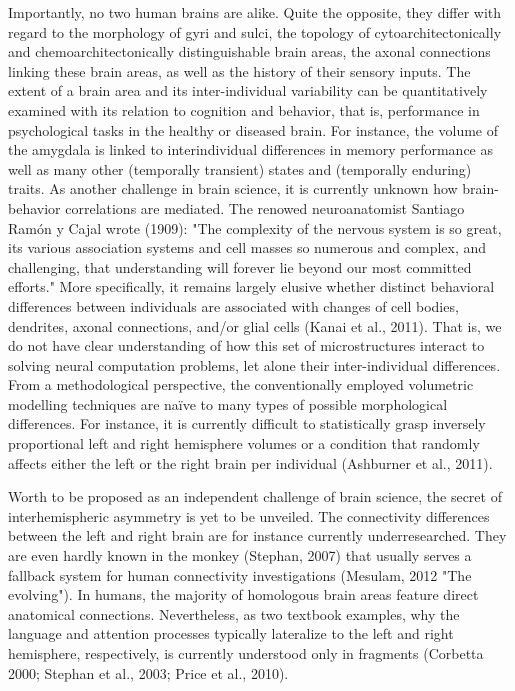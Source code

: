 \documentclass[authoryear,review,3p]{elsarticle}
\begin{document}
Importantly,
no two human brains are alike.
Quite the opposite,
they differ with regard to
the morphology of gyri and sulci,
the topology of cytoarchitectonically and chemoarchitectonically
distinguishable brain areas,
the axonal connections linking these brain areas,
as well as the history of their sensory inputs.
%
The extent of a brain area and its inter-individual variability
can be quantitatively examined with its relation to cognition and behavior,
that is,
performance in psychological tasks in the healthy or diseased brain.
For instance, the volume of the amygdala is linked to
interindividual differences in memory performance as well as
many other (temporally transient) states and
(temporally enduring) traits.
%
As another challenge in brain science,
it is currently unknown how
brain-behavior correlations are mediated.
%
The renowed neuroanatomist Santiago Ram\'{o}n y Cajal wrote (1909):
"The complexity of the nervous system is so great,
its various association systems and cell masses so numerous and
complex, and challenging,
that understanding will forever lie beyond our most committed efforts."
%
More specifically, it remains largely elusive
whether distinct behavioral differences
between individuals are associated with changes of
cell bodies, dendrites, axonal connections, and/or glial cells
(Kanai et al., 2011).
That is,
we do not have clear understanding of how
this set of microstructures interact to
solving neural computation problems,
let alone their inter-individual differences.
%
From a methodological perspective,
the conventionally employed
volumetric modelling techniques are na\"ive to
many types of possible morphological differences.
For instance,
it is currently difficult to statistically grasp
inversely proportional left and right hemisphere volumes
or
a condition that randomly affects either the left or the right brain
per individual
(Ashburner et al., 2011).


Worth to be proposed as an independent challenge of
brain science, the secret of interhemispheric
asymmetry is yet to be unveiled.
The connectivity differences between the left and right brain are
for instance currently underresearched.
They are even hardly known in the monkey (Stephan, 2007)
that usually serves a fallback system for human
connectivity investigations (Mesulam, 2012 "The evolving").
In humans, the majority of homologous brain areas feature
direct anatomical connections.
Nevertheless, as two textbook examples,
why the language and attention processes typically lateralize to
the left and right hemisphere, respectively,
is currently understood only in fragments
(Corbetta 2000; Stephan et al., 2003; Price et al., 2010).
\end{document}
